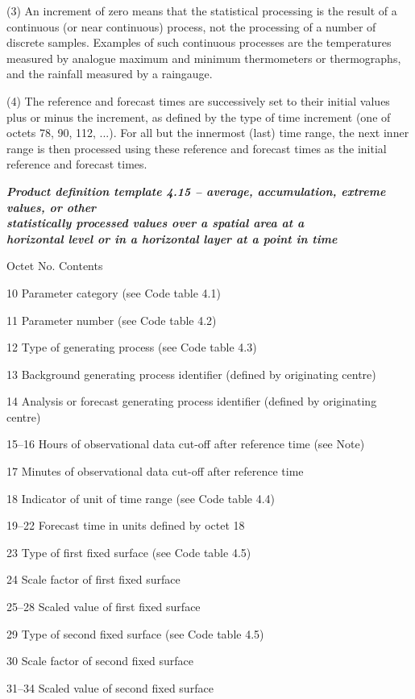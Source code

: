 (3) An increment of zero means that the statistical processing is the result of a continuous (or near continuous) process, not the processing of a number of discrete samples. Examples of such continuous processes are the temperatures measured by analogue maximum and minimum thermometers or thermographs, and the rainfall measured by a raingauge.

(4) The reference and forecast times are successively set to their initial values plus or minus the increment, as defined by the type of time increment (one of octets 78, 90, 112, ...). For all but the innermost (last) time range, the next inner range is then processed using these reference and forecast times as the initial reference and forecast times.

\emph{\textbf{Product definition template 4.15 -- average, accumulation, extreme values, or other\\
statistically processed values over a spatial area at a\\
horizontal level or in a horizontal layer at a point in time}}

Octet No. Contents

10 Parameter category (see Code table 4.1)

11 Parameter number (see Code table 4.2)

12 Type of generating process (see Code table 4.3)

13 Background generating process identifier (defined by originating centre)

14 Analysis or forecast generating process identifier (defined by originating centre)

15--16 Hours of observational data cut-off after reference time (see Note)

17 Minutes of observational data cut-off after reference time

18 Indicator of unit of time range (see Code table 4.4)

19--22 Forecast time in units defined by octet 18

23 Type of first fixed surface (see Code table 4.5)

24 Scale factor of first fixed surface

25--28 Scaled value of first fixed surface

29 Type of second fixed surface (see Code table 4.5)

30 Scale factor of second fixed surface

31--34 Scaled value of second fixed surface

